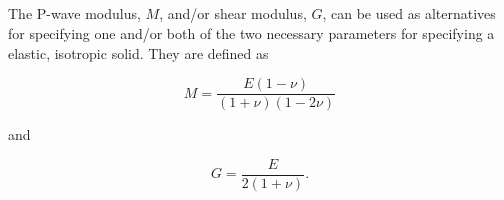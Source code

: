 \documentclass[journal abbreviation, manuscript]{copernicus}
\begin{document}
\subsection{}     %

\textcolor{YellowOrange}{The P-wave modulus, $M$, and/or shear modulus, $G$, can be used as alternatives for specifying one and/or both of the two necessary parameters for specifying a elastic, isotropic solid. They are defined as 

\begin{equation}
    M = \frac{E(1-\nu)}{(1+\nu)(1-2\nu)}
\end{equation}

\noindent and

\begin{equation}
\label{eq:shear_mod}
    G=\frac{E}{2(1+\nu)}.
\end{equation}}


\noappendix       %




\appendixfigures  %

\appendixtables   %






\end{document}
